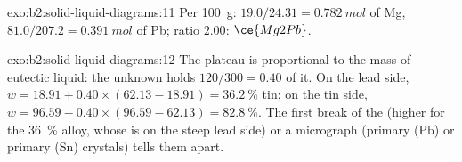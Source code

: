 \begin{solution}{exo:b2:solid-liquid-diagrams:11}
Per \qty{100}{g}: $19.0/24.31 = \qty{0.782}{mol}$ of Mg, $81.0/207.2 =
\qty{0.391}{mol}$ of Pb; ratio $2.00$: $\ce{Mg2Pb}$.
\end{solution}

\begin{solution}{exo:b2:solid-liquid-diagrams:12}
The plateau is proportional to the mass of eutectic liquid: the unknown holds
$120/300 = 0.40$ of it. On the lead side, $w = 18.91 + 0.40 \times (62.13 -
18.91) = 36.2~\%$ tin; on the tin side, $w = 96.59 - 0.40 \times (96.59 - 62.13) =
82.8~\%$. The first break of the  (higher for the 36~\% alloy,
whose  is on the steep lead side) or a micrograph (primary (Pb) or
primary (Sn) crystals) tells them apart.
\end{solution}

